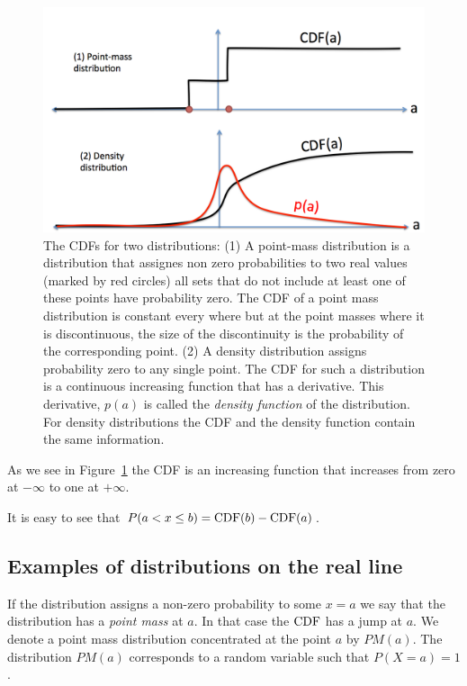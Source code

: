 \begin{figure}[h]
\begin{center}
\includegraphics[width=5in]{figs/CDFs.png}
\end{center}
\caption{The CDFs for two distributions: (1) A point-mass distribution
  is a distribution that assignes non zero probabilities to two real
  values (marked by red circles) all sets that do not include at least
  one of these points have probability zero. The CDF of a point mass
  distribution is constant every where but at the point masses where
  it is discontinuous, the size of the discontinuity is the
  probability of the corresponding point. (2) A density distribution
  assigns probability zero to any single point. The CDF for such a
  distribution is a continuous increasing function that has a
  derivative. This derivative, $p(a)$ is called the {\em density function} of
  the distribution. For density distributions the CDF and the density
  function contain the same information.\label{fig:CDF}}
\end{figure}

As we see in Figure~\ref{fig:CDF} the CDF is an increasing function that
increases from zero at $-\infty$ to one at $+\infty$.

It is easy to see that $P(a<x\leq b)=\mbox{CDF}(b)-\mbox{CDF}(a)$.


\subsection{Examples of distributions on the real line}
If the distribution assigns a non-zero probability to some $x=a$ we
say that the distribution has a {\em point mass} at $a$. In that case
the $\mbox{CDF}$ has a jump at $a$. We denote a point mass distribution
concentrated at the point $a$ by $PM(a)$. The distribution $PM(a)$
corresponds to a random variable such that $P(X=a)=1$.

